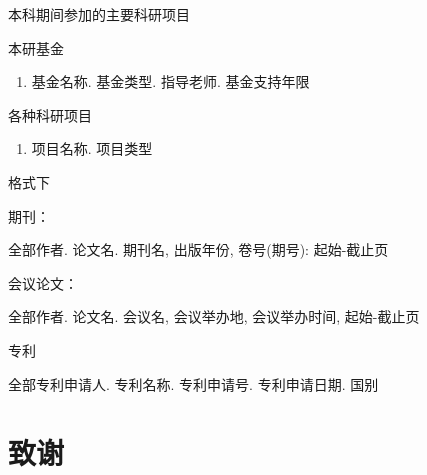 \documentclass[utf8, a4paper, 12pt]{book}
\newcommand\clearemptydoublepage{\clearpage{\thispagestyle{empty}\cleardoublepage}}
\newcommand{\songti}{\CJKfamily{songti}}
\begin{document}
本科期间参加的主要科研项目

\noindent 本研基金
\begin{enumerate}
	\item 基金名称. 基金类型. 指导老师. 基金支持年限
\end{enumerate}

\noindent 各种科研项目
\begin{enumerate}
	\item 项目名称. 项目类型
\end{enumerate}

格式下

期刊：

全部作者. 论文名. 期刊名, 出版年份, 卷号(期号): 起始-截止页

会议论文：

全部作者. 论文名. 会议名, 会议举办地, 会议举办时间, 起始-截止页

专利

全部专利申请人. 专利名称. 专利申请号. 专利申请日期. 国别



{
	\fancyhf{}
	\fancyfoot[RO,LE]{~\thepage~}
	\renewcommand{\headrulewidth}{0.7pt}
	\renewcommand{\footrulewidth}{0pt}
}
\fancyhf{}
\fancyfoot[RO,LE]{~\thepage~}
\renewcommand{\headrulewidth}{0.7pt}
\renewcommand{\footrulewidth}{0pt}
\clearemptydoublepage




\chapter*{致谢}
\songti\fontsize{12pt}{18pt}\selectfont %


{
	\fancyhf{}
	\fancyfoot[RO,LE]{~\thepage~}
	\renewcommand{\headrulewidth}{0.7pt}
	\renewcommand{\footrulewidth}{0pt}
}
\fancyhf{}
\fancyfoot[RO,LE]{~\thepage~}
\renewcommand{\headrulewidth}{0.7pt}
\renewcommand{\footrulewidth}{0pt}
\clearemptydoublepage
\end{document}
